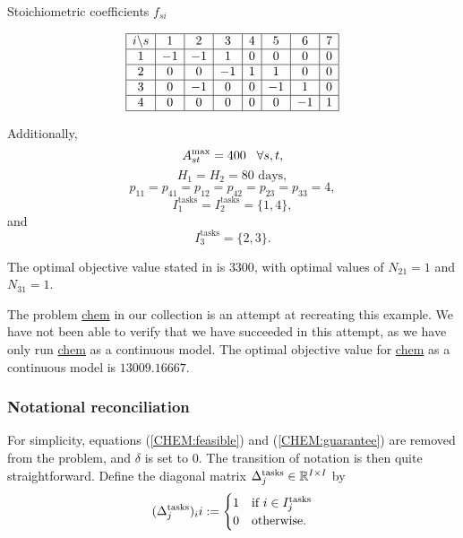 \begin{table}
\caption[Stoichiometric coefficients for test problem in batch chemical plant design]{Stoichiometric coefficients $f_{si}$}
\label{CHEM:stoich}
\[
\begin{array}{|c|c|c|c|c|c|c|c|}
\hline
i \backslash s	& 1	& 2	& 3	& 4	& 5	& 6	& 7\\ \hline
1		& -1	& -1	& 1	& 0 	& 0	& 0 	& 0\\ \hline
2		& 0	& 0	& -1	& 1	& 1	& 0	& 0\\ \hline
3		& 0	& -1	& 0	& 0	& -1	& 1	& 0\\ \hline
4		& 0	& 0	& 0	& 0	& 0	& -1	& 1\\ \hline
\end{array}
\]
\end{table}

Additionally, 
\[
A_{st}^{\text{max}} = 400 \hspace{3mm} \forall s,t,
\]
\[
H_1 = H_2 = 80 \text{ days},
\]
\[
p_{11} = p_{41} = p_{12} = p_{42} = p_{23} = p_{33} = 4,
\] 
\[
I_1^{\text{tasks}} = I_2^{\text{tasks}} = \{1,4\},
\]
and
\[
I_3^{\text{tasks}} = \{2,3\}.
\]


The optimal objective value stated in \cite{subrahmanyam94} is $3300$, with optimal values of $N_{21} = 1$ and $N_{31}=1$.

The problem \url{chem} in our collection is an attempt at recreating this example.  We have not been able to verify that we have succeeded in this attempt, as we have only run \url{chem} as a continuous model.  The optimal objective value for \url{chem} as a continuous model is $13009.16667$.  


\subsubsection{Notational reconciliation}

For simplicity, equations (\ref{CHEM:feasible}) and (\ref{CHEM:guarantee}) are removed from the problem, and $\delta$ is set to $0$.  The transition of notation is then quite straightforward.  Define the diagonal matrix $\Delta_j^{\text{tasks}} \in {\mathbb R}^{I \times I}$ by
\[
(\Delta_j^{\text{tasks}})_ii := 
\begin{cases}
	1	&	\text{if $i \in I_j^{\text{tasks}}$}\\
	0	&	\text{otherwise.}
\end{cases}
\]

